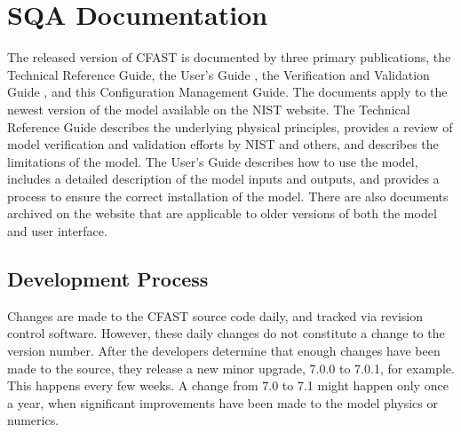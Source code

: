 \documentclass[12pt]{book}
\begin{document}
\chapter{SQA Documentation}

The released version of CFAST is documented by three primary publications, the Technical Reference Guide\cite{CFAST_Tech_Guide_7}, the User's Guide \cite{CFAST_Users_Guide_7}, the Verification and Validation Guide \cite{CFAST_Valid_Guide_7}, and this Configuration Management Guide. The documents apply to the newest version of the model available on the NIST website. The Technical Reference Guide describes the underlying physical principles, provides a review of model verification and validation efforts by NIST and others, and describes the limitations of the model.  The User's Guide describes how to use the model, includes a detailed description of the model inputs and outputs, and provides a process to ensure the correct installation of the model. There are also documents archived on the website that are applicable to older versions of both the model and user interface.

\section{Development Process}

Changes are made to the CFAST source code daily, and tracked via revision control software. However, these daily changes do not constitute a change to the version number. After the developers determine that enough changes have been made to the source, they release a new minor upgrade, 7.0.0 to 7.0.1, for example. This happens every few weeks. A change from 7.0 to 7.1 might happen only once a year, when significant improvements have been made to the model physics or numerics.
\end{document}
